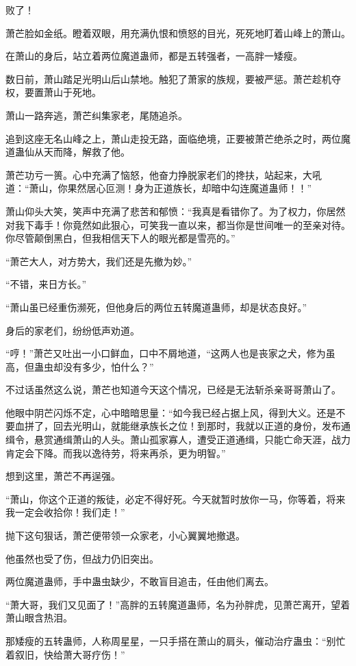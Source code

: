 \begin{this_body}
败了！

萧芒脸如金纸。瞪着双眼，用充满仇恨和愤怒的目光，死死地盯着山峰上的萧山。

在萧山的身后，站立着两位魔道蛊师，都是五转强者，一高胖一矮瘦。

数日前，萧山踏足光明山后山禁地。触犯了萧家的族规，要被严惩。萧芒趁机夺权，要置萧山于死地。

萧山一路奔逃，萧芒纠集家老，尾随追杀。

追到这座无名山峰之上，萧山走投无路，面临绝境，正要被萧芒绝杀之时，两位魔道蛊仙从天而降，解救了他。

萧芒功亏一篑。心中充满了恼怒，他奋力挣脱家老们的搀扶，站起来，大吼道：“萧山，你果然居心叵测！身为正道族长，却暗中勾连魔道蛊师！！”

萧山仰头大笑，笑声中充满了悲苦和郁愤：“我真是看错你了。为了权力，你居然对我下毒手！你竟然如此狠心，可笑我一直以来，都当你是世间唯一的至亲对待。你尽管颠倒黑白，但我相信天下人的眼光都是雪亮的。”

“萧芒大人，对方势大，我们还是先撤为妙。”

“不错，来日方长。”

“萧山虽已经重伤濒死，但他身后的两位五转魔道蛊师，却是状态良好。”

身后的家老们，纷纷低声劝道。

“哼！”萧芒又吐出一小口鲜血，口中不屑地道，“这两人也是丧家之犬，修为虽高，但蛊虫却没有多少，怕什么？”

不过话虽然这么说，萧芒也知道今天这个情况，已经是无法斩杀亲哥哥萧山了。

他眼中阴芒闪烁不定，心中暗暗思量：“如今我已经占据上风，得到大义。还是不要血拼了，回去光明山，就能继承族长之位！到那时，我就以正道的身份，发布通缉令，悬赏通缉萧山的人头。萧山孤家寡人，遭受正道通缉，只能亡命天涯，战力肯定会下降。而我以逸待劳，将来再杀，更为明智。”

想到这里，萧芒不再逞强。

“萧山，你这个正道的叛徒，必定不得好死。今天就暂时放你一马，你等着，将来我一定会收拾你！我们走！”

抛下这句狠话，萧芒便带领一众家老，小心翼翼地撤退。

他虽然也受了伤，但战力仍旧突出。

两位魔道蛊师，手中蛊虫缺少，不敢盲目追击，任由他们离去。

“萧大哥，我们又见面了！”高胖的五转魔道蛊师，名为孙胖虎，见萧芒离开，望着萧山眼含热泪。

那矮瘦的五转蛊师，人称周星星，一只手搭在萧山的肩头，催动治疗蛊虫：“别忙着叙旧，快给萧大哥疗伤！”


\end{this_body}
